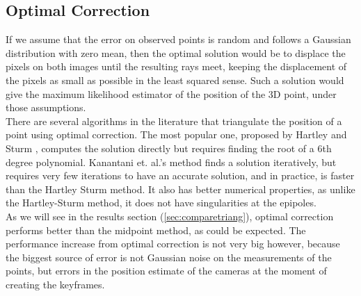 \subsection{Optimal Correction}
If we assume that the error on observed points is random and follows a Gaussian distribution with zero mean, then the optimal solution would be to displace the pixels on both images until the resulting rays meet, keeping the displacement of the pixels as small as possible in the least squared sense. Such a solution would give the maximum likelihood estimator of the position of the 3D point, under those assumptions.\\

There are several algorithms in the literature that triangulate the position of a point using optimal correction. The most popular one, proposed by Hartley and Sturm \cite{hartleysturm}, computes the solution directly but requires finding the root of a 6th degree polynomial. Kanantani et. al.'s method \cite{kanatani} finds a solution iteratively, but requires very few iterations to have an accurate solution, and in practice, is faster than the Hartley Sturm method. It also has better numerical properties, as unlike the Hartley-Sturm method, it does not have singularities at the epipoles.\\

As we will see in the results section (\ref{sec:comparetriang}), optimal correction performs better than the midpoint method, as could be expected. The performance increase from optimal correction is not very big however, because the biggest source of error is not Gaussian noise on the measurements of the points, but errors in the position estimate of the cameras at the moment of creating the keyframes.

